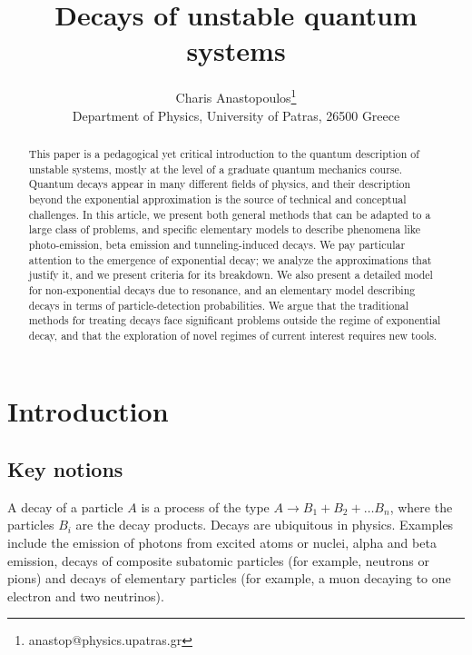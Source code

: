 \documentclass[12pt]{article}
\numberwithin{equation}{section}
\begin{document}
\title{Decays of unstable quantum systems}
\author{Charis Anastopoulos\footnote{anastop@physics.upatras.gr}\\ {\small Department of Physics, University of Patras, 26500 Greece} }
\maketitle

\begin{abstract}
This paper is a  pedagogical yet  critical  introduction to the quantum description of  unstable systems,  mostly at the level of  a graduate quantum mechanics course. Quantum decays appear in many different fields of physics, and their description beyond the exponential approximation is the source of technical and conceptual challenges.
In this article, we present both general methods that can be adapted to a large class of problems, and specific elementary models to describe phenomena
 like   photo-emission, beta emission and tunneling-induced decays. We pay particular attention to the emergence of exponential decay;  we analyze   the approximations that justify it,  and we present criteria for its breakdown. We also present  a detailed model for non-exponential decays due to resonance, and an elementary model describing  decays in terms of particle-detection probabilities.  We argue that the traditional methods for treating decays face significant problems outside the regime of exponential decay, and that the exploration of  novel regimes of current interest requires new tools.

\end{abstract}



\section{Introduction}

\subsection{Key notions}

A decay of a particle $A$ is a process of the type
 $A \rightarrow B_1 + B_2 + \ldots B_n$, where  the particles  $B_i$ are  the decay products. Decays are ubiquitous in physics. Examples include the emission of photons from excited atoms or nuclei, alpha and beta emission, decays of composite subatomic particles (for example, neutrons or  pions) and decays of elementary particles (for example, a muon decaying to one electron and two neutrinos).
\end{document}
